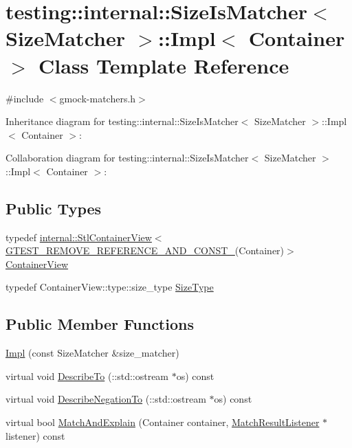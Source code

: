 \hypertarget{classtesting_1_1internal_1_1_size_is_matcher_1_1_impl}{}\section{testing\+:\+:internal\+:\+:Size\+Is\+Matcher$<$ Size\+Matcher $>$\+:\+:Impl$<$ Container $>$ Class Template Reference}
\label{classtesting_1_1internal_1_1_size_is_matcher_1_1_impl}


{\ttfamily \#include $<$gmock-\/matchers.\+h$>$}



Inheritance diagram for testing\+:\+:internal\+:\+:Size\+Is\+Matcher$<$ Size\+Matcher $>$\+:\+:Impl$<$ Container $>$\+:


Collaboration diagram for testing\+:\+:internal\+:\+:Size\+Is\+Matcher$<$ Size\+Matcher $>$\+:\+:Impl$<$ Container $>$\+:
\subsection*{Public Types}
\begin{DoxyCompactItemize}
\item 
typedef \hyperlink{classtesting_1_1internal_1_1_stl_container_view}{internal\+::\+Stl\+Container\+View}$<$ \hyperlink{gtest-internal_8h_a874567b176266188fabfffb8393267ce}{G\+T\+E\+S\+T\+\_\+\+R\+E\+M\+O\+V\+E\+\_\+\+R\+E\+F\+E\+R\+E\+N\+C\+E\+\_\+\+A\+N\+D\+\_\+\+C\+O\+N\+S\+T\+\_\+}(Container)$>$ \hyperlink{classtesting_1_1internal_1_1_size_is_matcher_1_1_impl_ae848755998eaaaa5e38366a2fc8b55e2}{Container\+View}
\item 
typedef Container\+View\+::type\+::size\+\_\+type \hyperlink{classtesting_1_1internal_1_1_size_is_matcher_1_1_impl_a5548da0c4c2245ca2fb520f44f0a687a}{Size\+Type}
\end{DoxyCompactItemize}
\subsection*{Public Member Functions}
\begin{DoxyCompactItemize}
\item 
\hyperlink{classtesting_1_1internal_1_1_size_is_matcher_1_1_impl_aa5279c8598ec8982546350fb442223f3}{Impl} (const Size\+Matcher \&size\+\_\+matcher)
\item 
virtual void \hyperlink{classtesting_1_1internal_1_1_size_is_matcher_1_1_impl_a2d09318bced4fd9adf951009d81a97ff}{Describe\+To} (\+::std\+::ostream $\ast$os) const 
\item 
virtual void \hyperlink{classtesting_1_1internal_1_1_size_is_matcher_1_1_impl_adb77690cb058ea5e2f56bb1ddcba0289}{Describe\+Negation\+To} (\+::std\+::ostream $\ast$os) const 
\item 
virtual bool \hyperlink{classtesting_1_1internal_1_1_size_is_matcher_1_1_impl_ae68cb5cb21f7c2c0026b1afdf7e74ebf}{Match\+And\+Explain} (Container container, \hyperlink{classtesting_1_1_match_result_listener}{Match\+Result\+Listener} $\ast$listener) const 
\end{DoxyCompactItemize}


